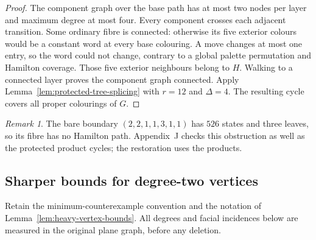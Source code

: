 \documentclass[11pt]{article}
\theoremstyle{remark}
\newtheorem{remark}[theorem]{Remark}
\numberwithin{equation}{section}
\numberwithin{table}{section}
\begin{document}
\begin{proof}
The component graph over the base path has at most two nodes per
layer and maximum degree at most four. Every component crosses each
adjacent transition. Some ordinary fibre is connected: otherwise its
five exterior colours would be a constant word at every base
colouring. A move changes at most one entry, so the word could not
change, contrary to a global palette permutation and Hamilton coverage.
Those five exterior neighbours belong to $H$. Walking to a connected
layer proves the component graph connected. Apply
Lemma~\ref{lem:protected-tree-splicing} with $r=12$ and $\Delta=4$.
The resulting cycle covers all proper colourings of $G$.
\end{proof}

\begin{remark}
The bare boundary $(2,2,1,1,3,1,1)$ has $526$ states and three leaves,
so its fibre has no Hamilton path. Appendix~J checks this obstruction
as well as the protected product cycles; the restoration uses the products.
\end{remark}

\subsection{Sharper bounds for degree-two vertices}
Retain the minimum-counterexample convention and the notation of
Lemma~\ref{lem:heavy-vertex-bounds}. All degrees and facial incidences
below are measured in the original plane graph, before any deletion.
\end{document}
